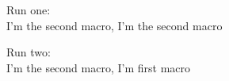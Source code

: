 \documentclass{article}
\begin{document}
\vspace*{\fill}\vspace{-5ex}

Run one:\\
\def\a{I'm first macro}
\def\b{\a}
\def\a{I'm the second macro}
\a, \b

Run two:\\
\def\a{I'm first macro}
\let\b=\a 
\def\a{I'm the second macro}
\a, \b


\vspace*{\fill}
\end{document}
